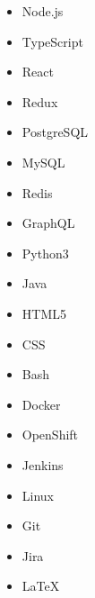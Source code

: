 

\begin{multicols}{5}
	\begin{itemize}
		\item Node.js
		\item TypeScript
		\item React
		\item Redux
		\item PostgreSQL
		\item MySQL
		\item Redis
		\item GraphQL
		\item Python3
		\item Java
		\item HTML5
		\item CSS
		\item Bash
		\item Docker
		\item OpenShift
		\item Jenkins
		\item Linux
		\item Git
		\item Jira
		\item LaTeX
	\end{itemize}
\end{multicols}
